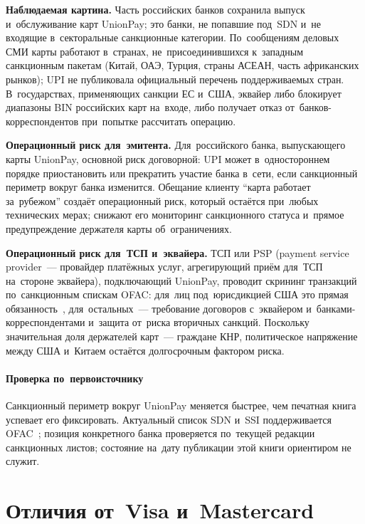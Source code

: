 \textbf{Наблюдаемая картина.} Часть российских банков сохранила выпуск
и~обслуживание карт UnionPay; это банки, не попавшие под~SDN и~не входящие
в~секторальные санкционные категории. По~сообщениям деловых СМИ карты работают
в~странах, не~присоединившихся к~западным санкционным пакетам (Китай, ОАЭ,
Турция, страны АСЕАН, часть африканских рынков); UPI не публиковала официальный
перечень поддерживаемых стран. В~государствах, применяющих санкции ЕС
и~США, эквайер либо блокирует диапазоны BIN российских карт на~входе, либо
получает отказ от~банков-корреспондентов при~попытке рассчитать операцию.

\textbf{Операционный риск для~эмитента.} Для~российского банка, выпускающего
карты UnionPay, основной риск договорной: UPI может в~одностороннем порядке
приостановить или прекратить участие банка в~сети, если санкционный периметр
вокруг банка изменится. Обещание клиенту \enquote{карта работает за~рубежом}
создаёт операционный риск, который остаётся при~любых технических мерах; снижают
его мониторинг санкционного статуса и~прямое предупреждение держателя
карты об~ограничениях.

\textbf{Операционный риск для~ТСП и~эквайера.} ТСП или PSP (payment service
  provider~--- провайдер платёжных услуг, агрегирующий приём для~ТСП на~стороне
эквайера), подключающий UnionPay, проводит скрининг транзакций
по~санкционным спискам OFAC: для~лиц под~юрисдикцией США это прямая
обязанность~\cite{ofac-faq-who-must-comply}, для~остальных~--- требование
договоров с~эквайером и~банками-корреспондентами и~защита от~риска
вторичных санкций. Поскольку значительная доля
держателей карт~--- граждане КНР, политическое напряжение между США и~Китаем
остаётся долгосрочным фактором риска.

\paragraph{Проверка по~первоисточнику}
Санкционный периметр вокруг UnionPay меняется быстрее, чем печатная книга
успевает его фиксировать. Актуальный список SDN и~SSI поддерживается
OFAC~\cite{ofac-sanctions-list-service}; позиция конкретного банка проверяется
по~текущей редакции санкционных листов; состояние на~дату публикации этой книги
ориентиром не служит.

\section{Отличия от~Visa и~Mastercard}\label{sec:up-vs-global}

